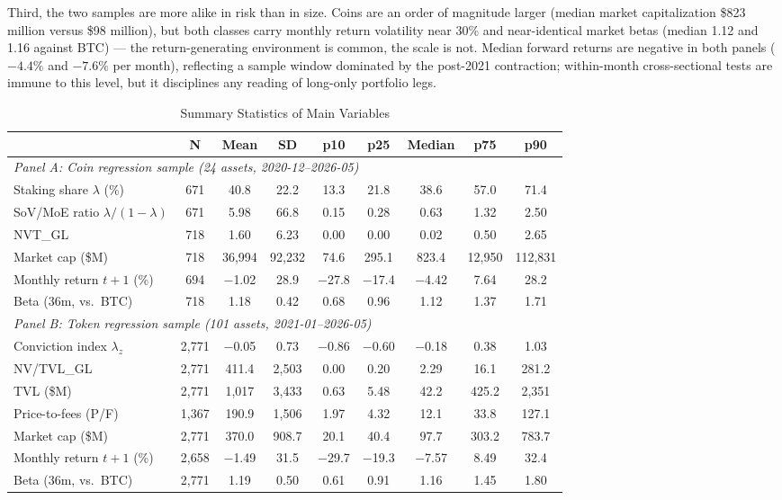 \documentclass[12pt]{article}
\begin{document}
Third, the two samples are more alike in risk than in size. Coins are an order of
magnitude larger (median market capitalization \$823 million versus \$98 million), but
both classes carry monthly return volatility near 30\% and near-identical market betas
(median 1.12 and 1.16 against BTC) --- the return-generating environment is common,
the scale is not. Median forward returns are negative in both panels ($-4.4\%$ and
$-7.6\%$ per month), reflecting a sample window dominated by the post-2021
contraction; within-month cross-sectional tests are immune to this level, but it
disciplines any reading of long-only portfolio legs.

\begin{table}[ht]
\centering
\caption{Summary Statistics of Main Variables}
\label{tab:summary}
\small
\setlength{\tabcolsep}{4pt}
\begin{tabular}{lcccccccc}
\toprule
 & N & Mean & SD & p10 & p25 & Median & p75 & p90 \\
\midrule
\multicolumn{9}{l}{\textit{Panel A: Coin regression sample (24 assets, 2020-12--2026-05)}} \\
Staking share $\lambda$ (\%) & 671 & 40.8 & 22.2 & 13.3 & 21.8 & 38.6 & 57.0 & 71.4 \\
SoV/MoE ratio $\lambda/(1-\lambda)$ & 671 & 5.98 & 66.8 & 0.15 & 0.28 & 0.63 & 1.32 & 2.50 \\
NVT\_GL & 718 & 1.60 & 6.23 & 0.00 & 0.00 & 0.02 & 0.50 & 2.65 \\
Market cap (\$M) & 718 & 36,994 & 92,232 & 74.6 & 295.1 & 823.4 & 12,950 & 112,831 \\
Monthly return $t{+}1$ (\%) & 694 & $-$1.02 & 28.9 & $-$27.8 & $-$17.4 & $-$4.42 & 7.64 & 28.2 \\
Beta (36m, vs.\ BTC) & 718 & 1.18 & 0.42 & 0.68 & 0.96 & 1.12 & 1.37 & 1.71 \\
\midrule
\multicolumn{9}{l}{\textit{Panel B: Token regression sample (101 assets, 2021-01--2026-05)}} \\
Conviction index $\lambda_z$ & 2,771 & $-$0.05 & 0.73 & $-$0.86 & $-$0.60 & $-$0.18 & 0.38 & 1.03 \\
NV/TVL\_GL & 2,771 & 411.4 & 2,503 & 0.00 & 0.20 & 2.29 & 16.1 & 281.2 \\
TVL (\$M) & 2,771 & 1,017 & 3,433 & 0.63 & 5.48 & 42.2 & 425.2 & 2,351 \\
Price-to-fees (P/F) & 1,367 & 190.9 & 1,506 & 1.97 & 4.32 & 12.1 & 33.8 & 127.1 \\
Market cap (\$M) & 2,771 & 370.0 & 908.7 & 20.1 & 40.4 & 97.7 & 303.2 & 783.7 \\
Monthly return $t{+}1$ (\%) & 2,658 & $-$1.49 & 31.5 & $-$29.7 & $-$19.3 & $-$7.57 & 8.49 & 32.4 \\
Beta (36m, vs.\ BTC) & 2,771 & 1.19 & 0.50 & 0.61 & 0.91 & 1.16 & 1.45 & 1.80 \\
\bottomrule
\end{tabular}
\smallskip


\end{table}
\end{document}
